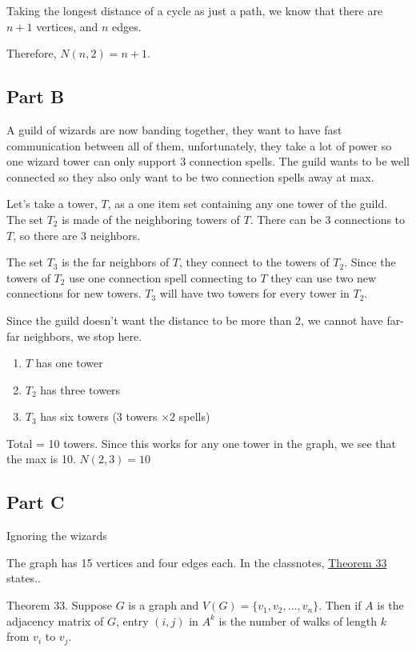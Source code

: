 \documentclass[answers]{exam}
\begin{document}
\begin{questions}
\begin{solution}
			Taking the longest distance of a cycle as just a path, we know that there are $n+1$ vertices, and $n$ edges. 

			Therefore, $N(n,2) = n+1$.

			\subsection*{Part B}

			A guild of wizards are now banding together, they want to have fast communication between all of them, unfortunately, they take a lot of power so one wizard tower can only support 3 connection spells. The guild wants to be well connected so they also only want to be two connection spells away at max.

			Let's take a tower, $T$, as a one item set containing any one tower of the guild. The set $T_2$ is made of the neighboring towers of $T$. There can be 3 connections to $T$, so there are 3 neighbors.

			The set $T_3$ is the far neighbors of $T$, they connect to the towers of $T_2$. Since the towers of $T_2$ use one connection spell connecting to $T$ they can use two new connections for new towers. $T_3$ will have two towers for every tower in $T_2$.

			Since the guild doesn't want the distance to be more than 2, we cannot have far-far neighbors, we stop here.
			\begin{enumerate}
				\item $T$ has one tower
				\item $T_2$ has three towers
				\item $T_3$ has six towers ($3$ towers $\times 2$ spells) 
			\end{enumerate}
			Total = 10 towers.
			Since this works for any one tower in the graph, we see that the max is 10. $N(2,3) = 10$

			\subsection*{Part C}
			Ignoring the wizards

			The graph has 15 vertices and four edges each. In the classnotes, \underline{Theorem 33} states..

			\begin{center}
			Theorem 33. Suppose $G$ is a graph and $V (G) = \{v_1, v_2, . . . , v_n\}$. Then if $A$ is the adjacency matrix of $G$, entry $(i, j)$ in $A^k$ is the number of walks of length $k$ from $v_i$ to $v_j$.
			\end{center}


\end{solution}
\end{questions}
\end{document}
